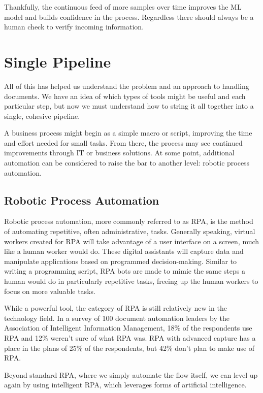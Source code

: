 \documentclass[conference, draftcls]{IEEEtran}
\begin{document}
Thankfully, the continuous feed of more samples over time improves the ML model and builds confidence in the process. Regardless there should always be a human check to verify incoming information.

\section{Single Pipeline} \label{sectionSinglePipeline}
All of this has helped us understand the problem and an approach to handling documents. We have an idea of which types of tools might be useful and each particular step, but now we must understand how to string it all together into a single, cohesive pipeline.

A business process might begin as a simple macro or script, improving the time and effort needed for small tasks. From there, the process may see continued improvements through IT or business solutions. At some point, additional automation can be considered to raise the bar to another level: robotic process automation.

\subsection{Robotic Process Automation}
Robotic process automation, more commonly referred to as RPA, is the method of automating repetitive, often administrative, tasks. Generally speaking, virtual workers created for RPA will take advantage of a user interface on a screen, much like a human worker would do. These digital assistants will capture data and manipulate applications based on programmed decision-making. Similar to writing a programming script, RPA bots are made to mimic the same steps a human would do in particularly repetitive tasks, freeing up the human workers to focus on more valuable tasks.

While a powerful tool, the category of RPA is still relatively new in the technology field. In a survey of 100 document automation leaders by the Association of Intelligent Information Management, 18\% of the respondents use RPA and 12\% weren't sure of what RPA was. RPA with advanced capture has a place in the plans of 25\% of the respondents, but 42\% don't plan to make use of RPA. \cite{hollander2019survey}

Beyond standard RPA, where we simply automate the flow itself, we can level up again by using intelligent RPA, which leverages forms of artificial intelligence.
\end{document}
